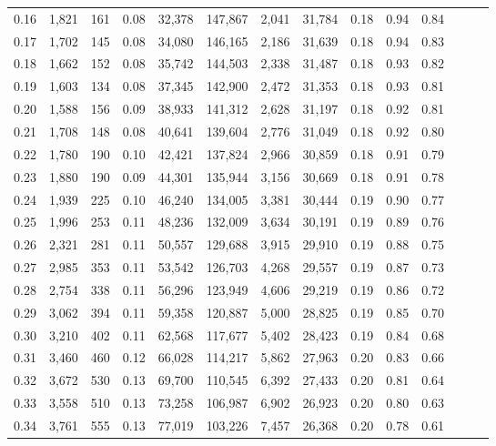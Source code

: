 \begin{tabular}{rrrrrrrrrrrrrr}
0.16 &  1,821 &  161 &  0.08 &   32,378 &  147,867 &   2,041 &  31,784 &  0.18 &  0.94 &      0.84 \\
0.17 &  1,702 &  145 &  0.08 &   34,080 &  146,165 &   2,186 &  31,639 &  0.18 &  0.94 &      0.83 \\
0.18 &  1,662 &  152 &  0.08 &   35,742 &  144,503 &   2,338 &  31,487 &  0.18 &  0.93 &      0.82 \\
0.19 &  1,603 &  134 &  0.08 &   37,345 &  142,900 &   2,472 &  31,353 &  0.18 &  0.93 &      0.81 \\
0.20 &  1,588 &  156 &  0.09 &   38,933 &  141,312 &   2,628 &  31,197 &  0.18 &  0.92 &      0.81 \\
0.21 &  1,708 &  148 &  0.08 &   40,641 &  139,604 &   2,776 &  31,049 &  0.18 &  0.92 &      0.80 \\
0.22 &  1,780 &  190 &  0.10 &   42,421 &  137,824 &   2,966 &  30,859 &  0.18 &  0.91 &      0.79 \\
0.23 &  1,880 &  190 &  0.09 &   44,301 &  135,944 &   3,156 &  30,669 &  0.18 &  0.91 &      0.78 \\
0.24 &  1,939 &  225 &  0.10 &   46,240 &  134,005 &   3,381 &  30,444 &  0.19 &  0.90 &      0.77 \\
0.25 &  1,996 &  253 &  0.11 &   48,236 &  132,009 &   3,634 &  30,191 &  0.19 &  0.89 &      0.76 \\
0.26 &  2,321 &  281 &  0.11 &   50,557 &  129,688 &   3,915 &  29,910 &  0.19 &  0.88 &      0.75 \\
0.27 &  2,985 &  353 &  0.11 &   53,542 &  126,703 &   4,268 &  29,557 &  0.19 &  0.87 &      0.73 \\
0.28 &  2,754 &  338 &  0.11 &   56,296 &  123,949 &   4,606 &  29,219 &  0.19 &  0.86 &      0.72 \\
0.29 &  3,062 &  394 &  0.11 &   59,358 &  120,887 &   5,000 &  28,825 &  0.19 &  0.85 &      0.70 \\
0.30 &  3,210 &  402 &  0.11 &   62,568 &  117,677 &   5,402 &  28,423 &  0.19 &  0.84 &      0.68 \\
0.31 &  3,460 &  460 &  0.12 &   66,028 &  114,217 &   5,862 &  27,963 &  0.20 &  0.83 &      0.66 \\
0.32 &  3,672 &  530 &  0.13 &   69,700 &  110,545 &   6,392 &  27,433 &  0.20 &  0.81 &      0.64 \\
0.33 &  3,558 &  510 &  0.13 &   73,258 &  106,987 &   6,902 &  26,923 &  0.20 &  0.80 &      0.63 \\
0.34 &  3,761 &  555 &  0.13 &   77,019 &  103,226 &   7,457 &  26,368 &  0.20 &  0.78 &      0.61 \\

\end{tabular}
